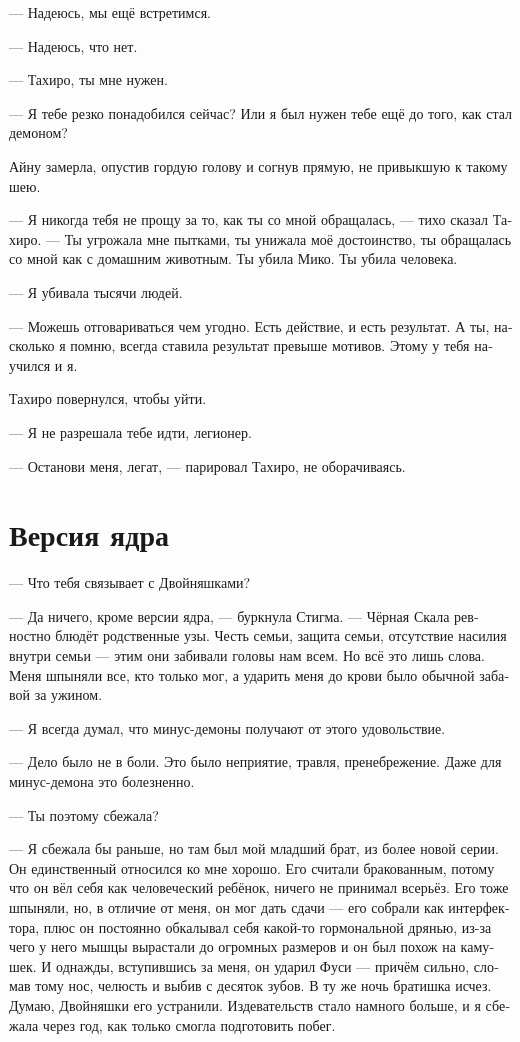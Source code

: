 \documentclass[a4paper,12pt,fleqn]{book}\usepackage{polyglossia}\setdefaultlanguage[babelshorthands=true]{russian}\setotherlanguage{english}\defaultfontfeatures{Ligatures=TeX,Mapping=tex-text}\usepackage{xcolor}\newcommand{\ml}[3]{#2}
\newcommand{\asterism}{\vspace{1em}{\centering\Large\bfseries$\ast~\ast~\ast$\par}\vspace{1em}}
\begin{document}
{\asterism

--- Надеюсь, мы ещё встретимся.

--- Надеюсь, что нет.

--- Тахиро, ты мне нужен.

--- Я тебе резко понадобился сейчас?
Или я был нужен тебе ещё до того, как стал демоном?

Айну замерла, опустив гордую голову и согнув прямую, не привыкшую к такому шею.

--- Я никогда тебя не прощу за то, как ты со мной обращалась, --- тихо сказал Тахиро.
--- Ты угрожала мне пытками, ты унижала моё достоинство, ты обращалась со мной как с домашним животным.
Ты убила Мико.
Ты убила человека.

--- Я убивала тысячи людей.

--- Можешь отговариваться чем угодно.
Есть действие, и есть результат.
А ты, насколько я помню, всегда ставила результат превыше мотивов.
Этому у тебя научился и я.

Тахиро повернулся, чтобы уйти.

--- Я не разрешала тебе идти, легионер.

--- Останови меня, легат, --- парировал Тахиро, не оборачиваясь.

\section{Версия ядра}

--- Что тебя связывает с Двойняшками?

--- Да ничего, кроме версии ядра, --- буркнула Стигма.
--- Чёрная Скала ревностно блюдёт родственные узы.
Честь семьи, защита семьи, отсутствие насилия внутри семьи --- этим они забивали головы нам всем.
Но всё это лишь слова.
Меня шпыняли все, кто только мог, а ударить меня до крови было обычной забавой за ужином.

--- Я всегда думал, что минус-демоны получают от этого удовольствие.

--- Дело было не в боли.
Это было неприятие, травля, пренебрежение.
Даже для минус-демона это болезненно.

--- Ты поэтому сбежала?

--- Я сбежала бы раньше, но там был мой младший брат, из более новой серии.
Он единственный относился ко мне хорошо.
Его считали бракованным, потому что он вёл себя как человеческий ребёнок, ничего не принимал всерьёз.
Его тоже шпыняли, но, в отличие от меня, он мог дать сдачи --- его собрали как интерфектора, плюс он постоянно обкалывал себя какой-то гормональной дрянью, из-за чего у него мышцы вырастали до огромных размеров и он был похож на камушек.
И однажды, вступившись за меня, он ударил Фуси --- причём сильно, сломав тому нос, челюсть и выбив с десяток зубов.
В ту же ночь братишка исчез.
Думаю, Двойняшки его устранили.
Издевательств стало намного больше, и я сбежала через год, как только смогла подготовить побег.

}
\end{document}
